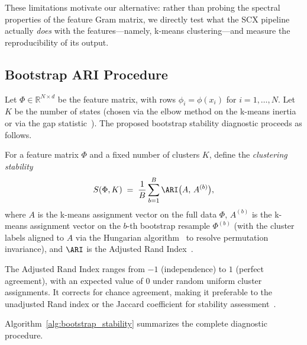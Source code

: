 These limitations motivate our alternative: rather than probing the spectral properties of the feature Gram matrix, we directly test what the SCX pipeline actually \emph{does} with the features---namely, k-means clustering---and measure the reproducibility of its output.

\subsection{Bootstrap ARI Procedure}

Let $\Phi \in \mathbb{R}^{N \times d}$ be the feature matrix, with rows $\phi_i = \phi(x_i)$ for $i = 1, \dots, N$. Let $K$ be the number of states (chosen via the elbow method on the k-means inertia or via the gap statistic~\cite{tibshirani2001gap}). The proposed bootstrap stability diagnostic proceeds as follows.

\begin{definition}
\label{def:stability}
For a feature matrix $\Phi$ and a fixed number of clusters $K$, define the \emph{clustering stability}
\[
S(\Phi, K) \;=\; \frac{1}{B}\sum_{b=1}^{B} \ARI\bigl(A,\, A^{(b)}\bigr),
\]
where $A$ is the k-means assignment vector on the full data $\Phi$, $A^{(b)}$ is the k-means assignment vector on the $b$-th bootstrap resample $\Phi^{(b)}$ (with the cluster labels aligned to $A$ via the Hungarian algorithm~\cite{kuhn1955hungarian} to resolve permutation invariance), and $\ARI$ is the Adjusted Rand Index~\cite{hubert1985comparing}.
\end{definition}

The Adjusted Rand Index ranges from $-1$ (independence) to $1$ (perfect agreement), with an expected value of $0$ under random uniform cluster assignments. It corrects for chance agreement, making it preferable to the unadjusted Rand index or the Jaccard coefficient for stability assessment~\cite{milligan1986study}.

Algorithm~\ref{alg:bootstrap_stability} summarizes the complete diagnostic procedure.

